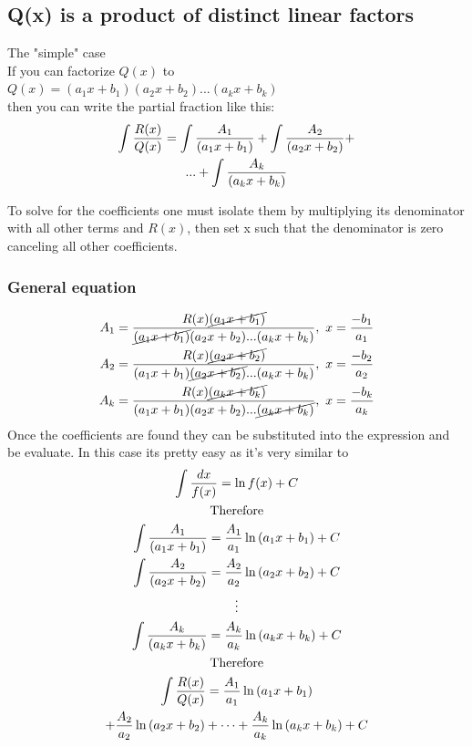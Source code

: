 \documentclass[letterpaper,10pt,twoside,twocolumn,openany]{book}
\begin{document}
\subsection{Q(x) is a product of distinct linear factors}
\begin{DndSidebar}{The "simple" case}\\
    If you can factorize $Q(x)$ to\\
    $ Q(x) = (a_1x + b_1)(a_2x + b_2)...(a_kx + b_k)$\\
    then you can write the partial fraction like this:
    \begin{gather}
        \nonumber
        \large\int \frac{R(x)}{Q(x)} = \int\frac{A_1}{(a_1x + b_1)} + \int\frac{A_2}{(a_2x + b_2)} +\\
        ... + \int\frac{A_k}{(a_kx + b_k)}
    \end{gather} 
\end{DndSidebar}
To solve for the coefficients one must isolate them by multiplying its denominator with all other terms and $R(x)$, then set x such that the denominator is zero canceling all other coefficients.
\subsubsection{General equation}
\begin{gather*}
    A_1 = \frac{R(x)\cancel{(a_1x + b_1)}}{\cancel{(a_1x + b_1)}(a_2x + b_2)...(a_kx + b_k)},\ x = \frac{-b_1}{a_1}\\
    A_2 = \frac{R(x)\cancel{(a_2x + b_2)}}{(a_1x + b_1)\cancel{(a_2x + b_2)}...(a_kx + b_k)},\ x = \frac{-b_2}{a_2}\\
    A_k = \frac{R(x)\cancel{(a_kx + b_k)}}{(a_1x + b_1)(a_2x + b_2)...\cancel{(a_kx + b_k)}},\ x = \frac{-b_k}{a_k}
\end{gather*}
Once the coefficients are found they can be substituted into the expression and be evaluate. In this case its pretty easy as it's very similar to 
\begin{gather*}
    \large\int \frac{dx}{f(x)} = \ln{f(x)} + C\\
    \text{Therefore}\\
    \int\frac{A_1}{(a_1x + b_1)} = \frac{A_1}{a_1}\ln{(a_1x + b_1)} + C\\
    \int\frac{A_2}{(a_2x + b_2)} = \frac{A_2}{a_2}\ln{(a_2x + b_2)} + C\\
    \vdots\\
    \int\frac{A_k}{(a_kx + b_k)} = \frac{A_k}{a_k}\ln{(a_kx + b_k)} + C\\
    \text{Therefore}\\
    \large\int \frac{R(x)}{Q(x)} = \frac{A_1}{a_1}\ln{(a_1x + b_1)}\\
    + \frac{A_2}{a_2}\ln{(a_2x + b_2)} +  \dots
    + \frac{A_k}{a_k}\ln{(a_kx + b_k)} + C
\end{gather*} 
\newpage
\end{document}
